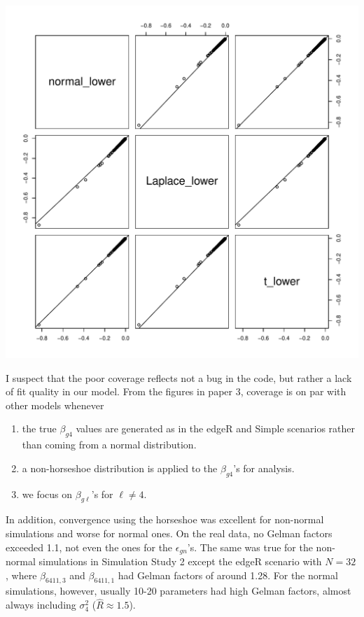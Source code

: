 \documentclass{article}
\begin{document}
\begin{flushleft}
\begin{minipage}{.45\textwidth}
\includegraphics[scale = 0.4]{lower}
\end{minipage}

I suspect that the poor coverage reflects not a bug in the code, but rather a lack of fit quality in our model. From the figures in paper 3, coverage is on par with other models whenever

\begin{enumerate}
\item the true $\beta_{g4}$ values are generated as in the edgeR and Simple scenarios rather than coming from a normal distribution. 
\item a non-horseshoe distribution is applied to the $\beta_{g4}$'s for analysis.
\item we focus on $\beta_{g\ell}$'s for $\ell \ne 4$.
\end{enumerate}

In addition, convergence using the horseshoe was excellent for non-normal simulations and worse for normal ones. On the real data, no Gelman factors exceeded 1.1, not even the ones for the $\epsilon_{gn}$'s. The same was true for the non-normal simulations in Simulation Study 2 except the edgeR scenario with $N = 32$, where $\beta_{6411, 3}$ and $\beta_{6411, 1}$ had Gelman factors of around 1.28. For the normal simulations, however, usually 10-20 parameters had high Gelman factors, almost always including $\sigma_4^2$ ($\widehat{R} \approx 1.5$). 

\end{flushleft}
% 
%
\end{document}

